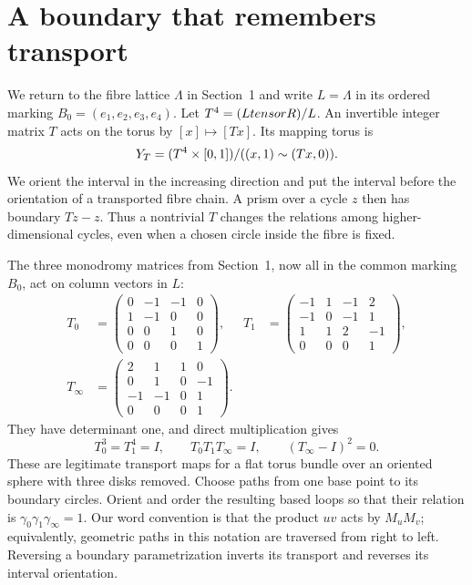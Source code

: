 \section{A boundary that remembers transport}\label{ntg:sec:boundary}

We return to the fibre lattice $\Lambda$ in Section~1 and write
$L=\Lambda$ in its ordered marking $B_0=(e_1,e_2,e_3,e_4)$. Let
$T^4=(LtensorR)/L$. An invertible integer matrix $T$ acts
on the torus by $[x]\mapsto[Tx]$. Its mapping torus is
\[
 Y_T=(T^4\times[0,1])/((x,1)\sim(Tx,0)).
\]
We orient the interval in the increasing direction and put the interval
before the orientation of a transported fibre chain. A prism over a
cycle $z$ then has boundary $Tz-z$. Thus a nontrivial $T$ changes the
relations among higher-dimensional cycles, even when a chosen circle
inside the fibre is fixed.

The three monodromy matrices from Section~1, now all in the common
marking $B_0$, act on column vectors in $L$:
\begin{equation}\label{ntg:eq:native}
\begin{aligned}
 T_0&=\begin{pmatrix}0&-1&-1&0\\1&-1&0&0\\0&0&1&0\\0&0&0&1\end{pmatrix},
 &T_1&=\begin{pmatrix}-1&1&-1&2\\-1&0&-1&1\\1&1&2&-1\\0&0&0&1\end{pmatrix},\\
 T_\infty&=\begin{pmatrix}2&1&1&0\\0&1&0&-1\\-1&-1&0&1\\0&0&0&1\end{pmatrix}.
\end{aligned}
\end{equation}
They have determinant one, and direct multiplication gives
\[
 T_0^3=T_1^4=I,\qquad T_0T_1T_\infty=I,
 \qquad (T_\infty-I)^2=0.
\]
These are legitimate transport maps for a flat torus bundle over an
oriented sphere with three disks removed. Choose paths from one base
point to its boundary circles. Orient and order the resulting based
loops so that their relation is $\gamma_0\gamma_1\gamma_\infty=1$.
Our word convention is that the product $uv$ acts by $M_uM_v$;
equivalently, geometric paths in this notation are traversed from
right to left. Reversing a boundary parametrization inverts its
transport and reverses its interval orientation.

